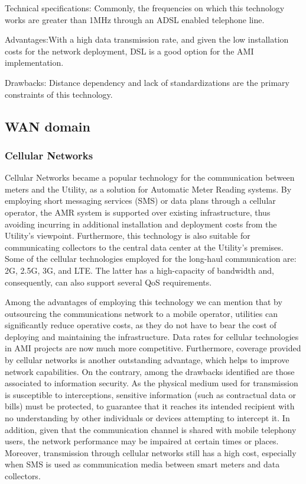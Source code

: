 \documentclass[11pt,draftclsnofoot,onecolumn]{IEEEtran}
\begin{document}
Technical specifications: Commonly, the frequencies on which this technology works are greater than 1MHz through an ADSL enabled telephone line. 

Advantages:With a high data transmission rate, and given the low installation costs for the network deployment, DSL is a good option for the AMI implementation.

Drawbacks: Distance dependency and lack of standardizations are the primary constraints of this technology.

\subsection{WAN domain}

\subsubsection{Cellular Networks}\label{tech::cellular}
Cellular Networks became a popular technology for the communication between meters and the Utility, as a solution for Automatic Meter Reading systems. By employing short messaging services (SMS) or data plans through a cellular operator, the AMR system is supported over existing infrastructure, thus avoiding incurring in additional installation and deployment costs from the Utility's viewpoint. Furthermore, this technology is also suitable for communicating collectors to the central data center at the Utility's premises. Some of the cellular technologies employed for the long-haul communication are: 2G, 2.5G, 3G, and LTE. The latter has a high-capacity of bandwidth and, consequently, can also support several QoS requirements.

Among the advantages of employing this technology we can mention that by outsourcing the communications network to a mobile operator, utilities can significantly reduce operative costs, as they do not have to bear the cost of deploying and maintaining the infrastructure. Data rates for cellular technologies in AMI projects are now much more competitive. Furthermore, coverage provided by cellular networks is another outstanding advantage, which helps to improve network capabilities. On the contrary, among the drawbacks identified are those associated to information security. As the physical medium used for transmission is susceptible to interceptions, sensitive information (such as contractual data or bills) must be protected, to guarantee that it reaches its intended recipient with no understanding by other individuals or devices attempting to intercept it. In addition, given that the communication channel is shared with mobile telephony users, the network performance may be impaired at certain times or places. Moreover, transmission through cellular networks still has a high cost, especially when SMS is used as communication media between smart meters and data collectors. 
\end{document}
